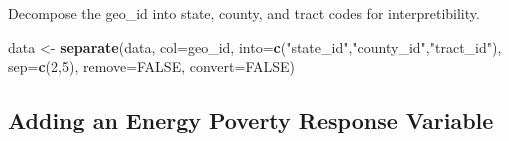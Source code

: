 \documentclass[]{article}
\newenvironment{Shaded}{\begin{snugshade}}{\end{snugshade}}
\newcommand{\DataTypeTok}[1]{\textcolor[rgb]{0.13,0.29,0.53}{#1}}
\newcommand{\DecValTok}[1]{\textcolor[rgb]{0.00,0.00,0.81}{#1}}
\newcommand{\KeywordTok}[1]{\textcolor[rgb]{0.13,0.29,0.53}{\textbf{#1}}}
\newcommand{\NormalTok}[1]{#1}
\newcommand{\OperatorTok}[1]{\textcolor[rgb]{0.81,0.36,0.00}{\textbf{#1}}}
\newcommand{\OtherTok}[1]{\textcolor[rgb]{0.56,0.35,0.01}{#1}}
\newcommand{\StringTok}[1]{\textcolor[rgb]{0.31,0.60,0.02}{#1}}
\begin{document}
\begin{Shaded}
\end{Shaded}

Decompose the geo\_id into state, county, and tract codes for
interpretibility.

\begin{Shaded}
\begin{Highlighting}[]
\NormalTok{data <-}\StringTok{ }\KeywordTok{separate}\NormalTok{(data,}
                 \DataTypeTok{col=}\NormalTok{geo_id,}
                 \DataTypeTok{into=}\KeywordTok{c}\NormalTok{(}\StringTok{"state_id"}\NormalTok{,}\StringTok{"county_id"}\NormalTok{,}\StringTok{"tract_id"}\NormalTok{),}
                 \DataTypeTok{sep=}\KeywordTok{c}\NormalTok{(}\DecValTok{2}\NormalTok{,}\DecValTok{5}\NormalTok{), }
                 \DataTypeTok{remove=}\OtherTok{FALSE}\NormalTok{, }
                 \DataTypeTok{convert=}\OtherTok{FALSE}\NormalTok{)}
\end{Highlighting}
\end{Shaded}

\hypertarget{adding-an-energy-poverty-response-variable}{%
\subsection{Adding an Energy Poverty Response
Variable}\label{adding-an-energy-poverty-response-variable}}
\end{document}
